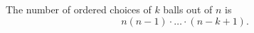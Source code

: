 

\setcounter{section}{2}
\setcounter{subsection}{3}
\setcounter{dfn}{9}

\begin{thm}
The number of ordered choices of $k$ balls out of $n$ is
\[
n(n-1)\cdot \ldots \cdot (n-k+1).
\]
\end{thm}



